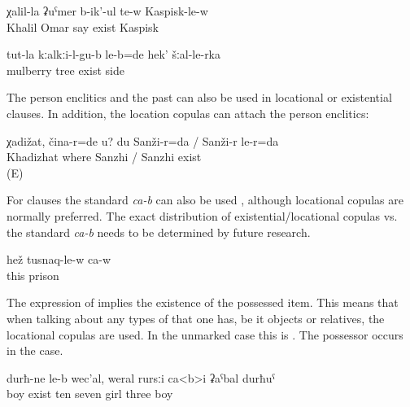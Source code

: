 \begin{exe}
	\ex	\label{ex:Omar's Khalil is in Kaspisk}
	\gll	χalil-la	ʡuˁmer	b-ik'-ul	te-w	Kaspisk-le-w\\
		Khalil	Omar	say	exist	Kaspisk\\
	\glt	{}

	\ex	\label{ex:‎They were under the mulberry tree, from that side}
	\gll	tut-la	kːalkːi-l-gu-b	le-b=de	hek'	šːal-le-rka\\
		mulberry	tree	exist		side\\
	\glt	{}

\end{exe}

The person enclitics  and the past   can also be used in locational or existential clauses. In addition, the location copulas can attach the person enclitics:
%
\begin{exe}
	\ex	\label{ex:‎Khadizhat, where are you? I am in Sanzhi}
	\gll	χadižat,	čina-r=de	u?	du	Sanži-r=da	/	Sanži-r	le-r=da\\
		Khadizhat	where			Sanzhi	/ Sanzhi exist\\
	\glt	{} (E)
\end{exe}

For  clauses the standard  \textit{ca-b} can also be used , although locational copulas are normally preferred. The exact distribution of existential/locational copulas vs. the standard  \textit{ca-b} needs to be determined by future research. 

 \begin{exe}
	\ex	\label{ex:‎He is in prison}
	\gll	hež	tusnaq-le-w	ca-w\\
		this	prison	\\
	\glt	{}
\end{exe}

 
The expression of  implies the existence of the possessed item. This means that when talking about any types of  that one has, be it objects or relatives, the locational copulas are used. In the unmarked case this is  . The possessor occurs in the  case.
%
\begin{exe}
	\ex	\label{ex:‎(I) have ten children; they are seven girls and three boys}
	\gll	durħ-ne	le-b	wec'al,	weral	rursːi	ca<b>i	ʡaˁbal	durħuˁ\\
		boy	exist	ten	seven	girl		three	boy\\
	\glt	{}
\end{exe}

